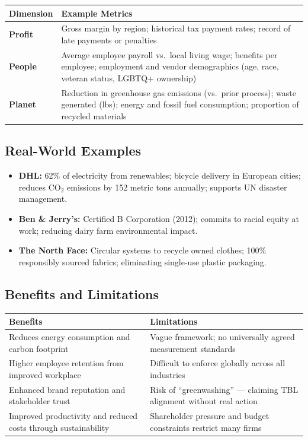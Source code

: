 \documentclass[11pt, letterpaper]{article}
\begin{document}
\begin{center}
\begin{tabular}{>{\bfseries}p{1.8cm} p{10.5cm}}
\toprule
Dimension & Example Metrics \\
\midrule
Profit & Gross margin by region; historical tax payment rates; record of late payments or penalties \\
\addlinespace
People & Average employee payroll vs.\ local living wage; benefits per employee; employment and vendor demographics (age, race, veteran status, LGBTQ+ ownership) \\
\addlinespace
Planet & Reduction in greenhouse gas emissions (vs.\ prior process); waste generated (lbs); energy and fossil fuel consumption; proportion of recycled materials \\
\bottomrule
\end{tabular}
\end{center}

\subsection{Real-World Examples}

\begin{itemize}[leftmargin=*]
  \item \textbf{DHL:} 62\% of electricity from renewables; bicycle delivery in European cities; reduces CO$_2$ emissions by 152 metric tons annually; supports UN disaster management.
  \item \textbf{Ben \& Jerry's:} Certified B Corporation (2012); commits to racial equity at work; reducing dairy farm environmental impact.
  \item \textbf{The North Face:} Circular systems to recycle owned clothes; 100\% responsibly sourced fabrics; eliminating single-use plastic packaging.
\end{itemize}

\subsection{Benefits and Limitations}

\begin{center}
\begin{tabular}{p{6.5cm} p{6.5cm}}
\toprule
\textbf{Benefits} & \textbf{Limitations} \\
\midrule
Reduces energy consumption and carbon footprint & Vague framework; no universally agreed measurement standards \\
Higher employee retention from improved workplace & Difficult to enforce globally across all industries \\
Enhanced brand reputation and stakeholder trust & Risk of ``greenwashing'' --- claiming TBL alignment without real action \\
Improved productivity and reduced costs through sustainability & Shareholder pressure and budget constraints restrict many firms \\
\bottomrule
\end{tabular}
\end{center}
\end{document}
